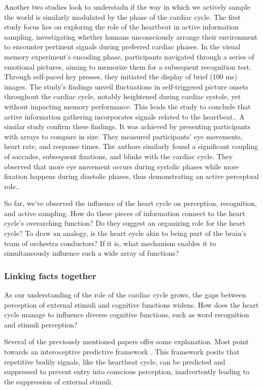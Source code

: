 \documentclass[12pt,oneside,openright]{report}
\begin{document}
Another two studies look to understadn if the way in which we actively sample the world is similarly modulated by the phase of the cardiac cycle. The first study focus lies on exploring the role of the heartbeat in active information sampling, investigating whether humans unconsciously arrange their environment to encounter pertinent signals during preferred cardiac phases. In the visual memory experiment's encoding phase, participants navigated through a series of emotional pictures, aiming to memorize them for a subsequent recognition test. Through self-paced key presses, they initiated the display of brief (100 ms) images. The study's findings unveil fluctuations in self-triggered picture onsets throughout the cardiac cycle, notably heightened during cardiac systole, yet without impacting memory performance. This leads the study to conclude that active information gathering incorporates signals related to the heartbeat.\parencite{Kunzendorf2019-vz}. A similar study confirm these findings. It was achieved by presenting participants with arrays to compare in size. They measured participants' eye movements, heart rate, and response times. The authors similarly found a significant coupling of saccades, subsequent fixations, and blinks with the cardiac cycle. They observed that more eye movement occurs during systolic phases while more fixation happens during diastolic phases, thus demonstrating an active perceptual role.\parencite{GalvezPol2018ActiveSI}.

So far, we've observed the influence of the heart cycle on perception, recognition, and active sampling. How do these pieces of information connect to the heart cycle's overarching function? Do they suggest an organizing role for the heart cycle? To draw an analogy, is the heart cycle akin to being part of the brain's team of orchestra conductors? If it is, what mechanism enables it to simultaneously influence such a wide array of functions?

\subsubsection*{Linking facts together}

As our understanding of the role of the cardiac cycle grows, the gaps between perception of external stimuli and cognitive functions widens. How does the heart cycle manage to influence diverse cognitive functions, such as word recognition and stimuli perception?

Several of the previously mentioned papers offer some explanation. Most point towards an interoceptive predictive framework . This framework posits that repetitive bodily signals, like the heartbeat cycle, can be predicted and suppressed to prevent entry into conscious perception, inadvertently leading to the suppression of external stimuli\parencite{AL2021118247, SALTAFOSSI2023108642,Allen2022}. 
\end{document}
